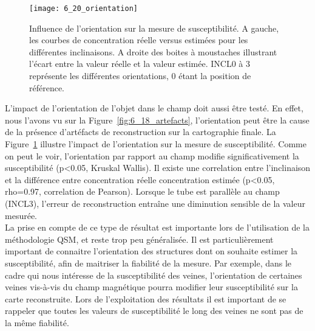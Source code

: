 {%
\begin{figure}[!b]
\centering
\texttt{[image: 6\_20\_orientation]}
\caption{Influence de l'orientation sur la mesure de susceptibilité. A gauche, les courbes de concentration réelle versus
estimées pour les différentes inclinaisons. A droite des boites à moustaches illustrant l'écart entre la valeur réelle et la valeur
estimée. INCL0 à 3 représente les différentes orientations, 0 étant la position de référence.}
\label{fig:6_20_orientation}	
\end{figure}
L’impact de l’orientation de l’objet dans le champ doit aussi être testé. En effet, nous l’avons
vu sur la Figure~\ref{fig:6_18_artefacts}, l’orientation peut être la cause de la présence d’artéfacts de reconstruction sur la
cartographie finale. La Figure~\ref{fig:6_20_orientation} illustre l’impact de l’orientation sur la mesure de susceptibilité.
Comme on peut le voir, l’orientation par rapport au champ modifie significativement la susceptibilité
(p<0.05, Kruskal Wallis). Il existe une correlation entre l’inclinaison et la différence entre concentration
réelle concentration estimée (p<0.05, rho=0.97, correlation de Pearson). Lorsque le tube est parallèle
au champ (INCL3), l’erreur de reconstruction entraîne une diminution sensible de la valeur mesurée.\\
La prise en compte de ce type de résultat est importante lors de l’utilisation de la méthodologie
QSM, et reste trop peu généralisée. Il est particulièrement important de connaitre l’orientation des
structures dont on souhaite estimer la susceptibilité, afin de maitriser la fiabilité de la mesure. Par
exemple, dans le cadre qui nous intéresse de la susceptibilité des veines, l’orientation de certaines
veines vis-à-vis du champ magnétique pourra modifier leur susceptibilité sur la carte reconstruite. Lors
de l’exploitation des résultats il est important de se rappeler que toutes les valeurs de susceptibilité le
long des veines ne sont pas de la même fiabilité.
}
